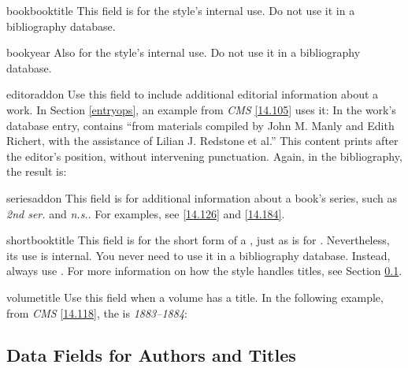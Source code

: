 \documentclass[11pt,letterpaper,oneside]{article}
\begin{document}
\begin{marglist}

\item[bookbooktitle] This field is for the style's internal use. Do
not use it in a bibliography database.

\item[bookyear] Also for the style's internal use. Do not use it in a
bibliography database.

\item[editoraddon] Use this field to include additional editorial
information about a work. In Section \ref{entryops}, an example from
\textit{CMS} \ref{14.105} uses it: In the work's database entry,
 contains ``from materials compiled by John M.
Manly and Edith Richert, with the assistance of Lilian J. Redstone et
al.'' This content prints after the editor's position, without
intervening punctuation. Again, in the bibliography, the result is:

\begin{bibonly}
\nocite{chaucer1966}
\end{bibonly}

\item[seriesaddon] This field is for additional information about a
book's series, such as \textit{2nd ser.} and \textit{n.s.}. For
examples, see \ref{14.126} and \ref{14.184}.

\item[shortbooktitle] This field is for the short form of a
, just as  is for
. Nevertheless, its use is internal. You never need to
use it in a bibliography database. Instead, always use
. For more information on how the style handles
titles, see Section \ref{authtitles}.

\item[volumetitle] Use this field when a volume has a title. In the
following example, from \textit{CMS} \ref{14.118}, the
 is \textit{1883--1884}:

\begin{citeonly}
\item \cite*[32--33]{james1963.5}
\end{citeonly}

\end{marglist}

\subsection{Data Fields for Authors and Titles}
\label{authtitles}
\end{document}
